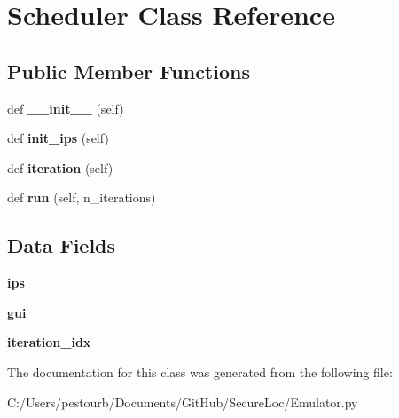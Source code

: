 \hypertarget{class_emulator_1_1_scheduler}{}\section{Scheduler Class Reference}
\label{class_emulator_1_1_scheduler}
\subsection*{Public Member Functions}
\begin{DoxyCompactItemize}
\item 
\mbox{\label{class_emulator_1_1_scheduler_ae64f0875afe3067b97ba370b354b9213}} 
def {\bfseries \+\_\+\+\_\+init\+\_\+\+\_\+} (self)
\item 
\mbox{\label{class_emulator_1_1_scheduler_a0dafe2cc81a4c9dab0b31820abddbe73}} 
def {\bfseries init\+\_\+ips} (self)
\item 
\mbox{\label{class_emulator_1_1_scheduler_a6c0c149ba469b3f9d672b17b9e1c3bfb}} 
def {\bfseries iteration} (self)
\item 
\mbox{\label{class_emulator_1_1_scheduler_a090ec0c015e1b1fd88ad1baaa9836a77}} 
def {\bfseries run} (self, n\+\_\+iterations)
\end{DoxyCompactItemize}
\subsection*{Data Fields}
\begin{DoxyCompactItemize}
\item 
\mbox{\label{class_emulator_1_1_scheduler_a87199ef607e15c8c6d3482bd6e41f481}} 
{\bfseries ips}
\item 
\mbox{\label{class_emulator_1_1_scheduler_aea7d0b804bf0846c549d1b166526a88c}} 
{\bfseries gui}
\item 
\mbox{\label{class_emulator_1_1_scheduler_aa54a967089e87b608ef85a8d90229cd0}} 
{\bfseries iteration\+\_\+idx}
\end{DoxyCompactItemize}


The documentation for this class was generated from the following file\+:\begin{DoxyCompactItemize}
\item 
C\+:/\+Users/pestourb/\+Documents/\+Git\+Hub/\+Secure\+Loc/Emulator.\+py\end{DoxyCompactItemize}
